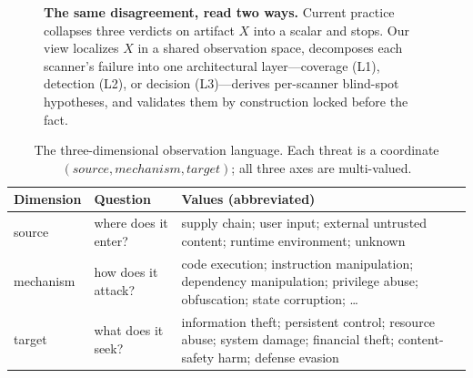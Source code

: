 \documentclass[sigconf,nonacm]{acmart}
\begin{document}
\begin{figure}[t]
\caption{\textbf{The same disagreement, read two ways.} Current practice collapses three verdicts on artifact $X$ into a scalar and stops. Our view localizes $X$ in a shared observation space, decomposes each scanner's failure into one architectural layer---coverage (L1), detection (L2), or decision (L3)---derives per-scanner blind-spot hypotheses, and validates them by construction locked before the fact.}
\label{fig:pipeline}
\end{figure}

\begin{table}[t]
\caption{The three-dimensional observation language. Each threat is a coordinate $(source, mechanism, target)$; all three axes are multi-valued.}
\label{tab:dims}
\small
\begin{tabular}{@{}p{1.2cm}p{1.9cm}p{4.6cm}@{}}
\toprule
Dimension & Question & Values (abbreviated) \\
\midrule
source & where does it enter? & supply chain; user input; external untrusted content; runtime environment; unknown \\
mechanism & how does it attack? & code execution; instruction manipulation; dependency manipulation; privilege abuse; obfuscation; state corruption; \ldots \\
target & what does it seek? & information theft; persistent control; resource abuse; system damage; financial theft; content-safety harm; defense evasion \\
\bottomrule
\end{tabular}
\end{table}
\end{document}
